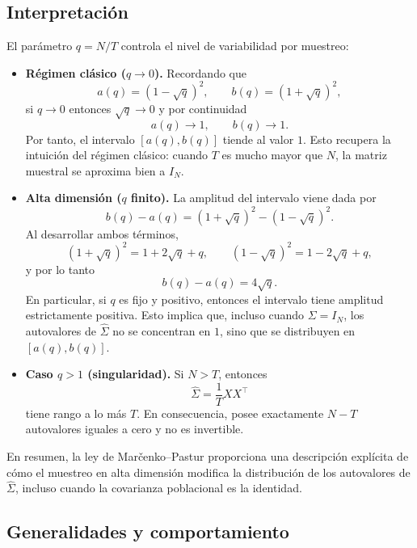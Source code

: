 \documentclass[letterpaper,12pt,oneside]{book}
\begin{document}
\subsection*{Interpretación}

El parámetro $q = N/T$ controla el nivel de variabilidad por muestreo:

\begin{itemize}

    \item \textbf{Régimen clásico ($q \to 0$).} 
    Recordando que
    \[
    a(q)=(1-\sqrt{q})^2,
    \qquad
    b(q)=(1+\sqrt{q})^2,
    \]
    si $q \to 0$ entonces $\sqrt{q} \to 0$ y por continuidad
    \[
    a(q) \to 1,
    \qquad
    b(q) \to 1.
    \]
    Por tanto, el intervalo $[a(q),b(q)]$ tiende al valor $1$.
    Esto recupera la intuición del régimen clásico: cuando $T$ es mucho mayor que $N$,
    la matriz muestral se aproxima bien a $I_N$.

    \item \textbf{Alta dimensión ($q$ finito).} 
    La amplitud del intervalo viene dada por
    \[
    b(q)-a(q)
    =
    (1+\sqrt{q})^2 - (1-\sqrt{q})^2.
    \]
    Al desarrollar ambos términos,
    \[
    (1+\sqrt{q})^2 = 1 + 2\sqrt{q} + q,
    \qquad
    (1-\sqrt{q})^2 = 1 - 2\sqrt{q} + q,
    \]
    y por lo tanto
    \[
    b(q)-a(q) = 4\sqrt{q}.
    \]
    En particular, si $q$ es fijo y positivo, entonces el intervalo tiene amplitud estrictamente positiva. Esto implica que, incluso cuando $\Sigma = I_N$, los autovalores de $\widehat{\Sigma}$ no se concentran en $1$, sino que se distribuyen en $[a(q),b(q)]$.

    \item \textbf{Caso $q>1$ (singularidad).} 
    Si $N>T$, entonces
    \[
    \widehat{\Sigma} = \frac{1}{T}XX^\top
    \]
    tiene rango a lo más $T$. En consecuencia, posee exactamente $N-T$ autovalores iguales a cero y no es invertible.
    
\end{itemize}

En resumen, la ley de Marčenko--Pastur proporciona una descripción explícita de cómo el muestreo en alta dimensión modifica la distribución de los autovalores de $\widehat{\Sigma}$, incluso cuando la covarianza poblacional es la identidad.

\subsection*{Generalidades y comportamiento}
\end{document}
